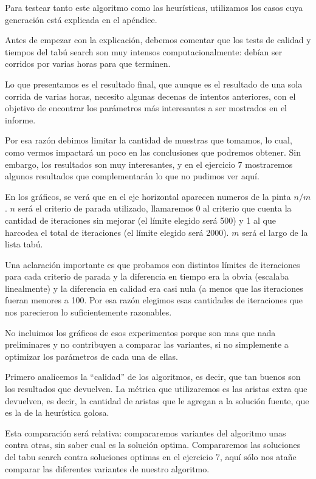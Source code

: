 
Para testear tanto este algoritmo como las heurísticas, utilizamos los casos cuya generación está explicada en el ap\'endice.

Antes de empezar con la explicación, debemos comentar que los tests de calidad y tiempos del tabú search son muy intensos computacionalmente: debían ser corridos por varias horas para que terminen.

Lo que presentamos es el resultado final, que aunque es el resultado de una sola corrida de varias horas, necesito algunas decenas de intentos anteriores, con el objetivo de encontrar los parámetros más interesantes a ser mostrados en el informe.

Por esa razón debimos limitar la cantidad de muestras que tomamos, lo cual, como vermos impactará un poco en las conclusiones que podremos obtener.
Sin embargo, los resultados son muy interesantes, y en el ejercicio 7 mostraremos algunos resultados que complementarán lo que no pudimos ver aquí.




En los gráficos, se verá que en el eje horizontal aparecen numeros de la pinta $n/m$.
$n$ será el criterio de parada utilizado, llamaremos 0 al criterio que cuenta la cantidad de iteraciones sin mejorar (el límite elegido será 500) y 1 al que harcodea el total de iteraciones (el límite elegido será 2000).
$m$ será el largo de la lista tabú.


Una aclaración importante es que probamos con distintos límites de iteraciones para cada criterio de parada y la diferencia en tiempo era la obvia (escalaba linealmente) y la diferencia en calidad era casi nula (a menos que las iteraciones fueran menores a 100. Por esa razón elegimos esas cantidades de iteraciones que nos parecieron lo suficientemente razonables.

No incluimos los gráficos de esos experimentos porque son mas que nada preliminares y no contribuyen a comparar las variantes, si no simplemente a optimizar los parámetros de cada una de ellas.



Primero analicemos la ``calidad'' de los algoritmos, es decir, que tan buenos son los resultados que devuelven. La métrica que utilizaremos es las aristas extra que devuelven, es decir, la cantidad de aristas que le agregan a la solución fuente, que es la de la heurística golosa.

Esta comparación será relativa: compararemos variantes del algoritmo unas contra otras, sin saber cual es la solución optima. Compararemos las soluciones del tabu search contra soluciones optimas en el ejercicio 7, aquí sólo nos atañe comparar las diferentes variantes de nuestro algoritmo.

